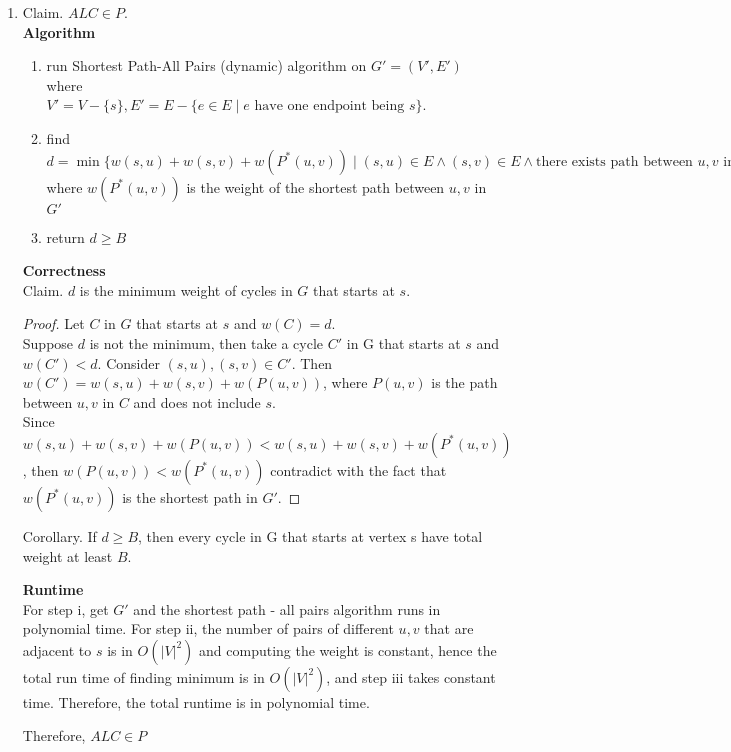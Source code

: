 \documentclass[11pt]{article}
\begin{document}
\begin{enumerate}
\begin{enumerate}
    \item Claim. $ALC\in P$. \\
    \textbf{Algorithm} 
    \begin{enumerate}
        \item run Shortest Path-All Pairs (dynamic) algorithm on $G'=(V',E')$ where \\ 
        $V'=V-\{s\}, E'=E-\{e\in E\mid e \text{ have one endpoint being }s\}$.
        \item find $d = \min\{w(s,u) + w(s,v) + w(P^*(u,v))\mid (s,u)\in E \land (s,v)\in E \land \text{there exists path between } u,v \text{ in }G', u\neq v\}$ where $w(P^*(u,v))$ is the weight of the shortest path between $u,v$ in $G'$
        \item return $d\geq B$
    \end{enumerate}
\textbf{Correctness} \\
Claim. $d$ is the minimum weight of cycles in $G$ that starts at $s$.
\begin{proof}
Let $C$ in $G$ that starts at $s$ and $w(C)=d$. \\
Suppose $d$ is not the minimum, then take a cycle $C'$ in G that starts at $s$ and $w(C')<d$. Consider $(s,u), (s,v)\in C'$. Then $w(C') = w(s,u) + w(s,v) + w(P(u,v))$, where $P(u,v)$ is the path between $u,v$ in $C$ and does not include $s$. \\
Since $w(s,u)+w(s,v)+w(P(u,v)) < w(s,u)+w(s,v)+w(P^*(u,v))$, then $w(P(u,v))<w(P^*(u,v))$ contradict with the fact that $w(P^*(u,v))$ is the shortest path in $G'$.
\end{proof}

Corollary. If $d \geq B$, then every cycle in G that starts at vertex s have total weight at least $B$.

\textbf{Runtime} \\
For step i, get $G'$ and the shortest path - all pairs algorithm runs in polynomial time. For step ii, the number of pairs of different $u,v$ that are adjacent to $s$ is in $O(|V|^2)$ and computing the weight is constant, hence the total run time of finding minimum is in $O(|V|^2)$, and step iii takes constant time. Therefore, the total runtime is in polynomial time. 

Therefore, $ALC\in P$\\



\end{enumerate}
\end{enumerate}
\end{document}
